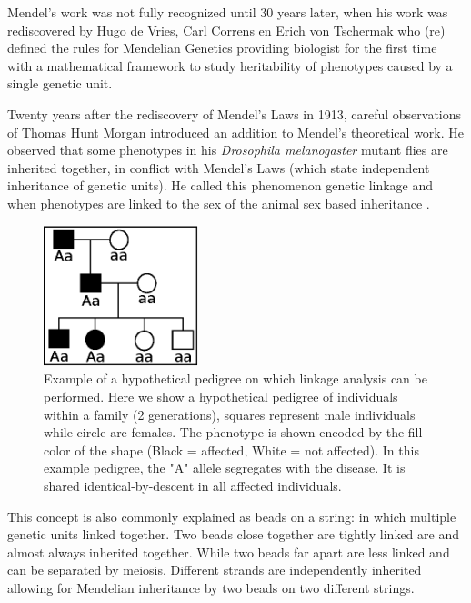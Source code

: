 Mendel's work was not fully recognized until 30 years later, when his work was 
rediscovered by Hugo de Vries, Carl Correns en Erich von Tschermak who (re) defined the 
rules for Mendelian Genetics \cite{deVries:1889} providing biologist for the first 
time with a mathematical framework to study heritability of phenotypes caused by a 
single genetic unit.

Twenty years after the rediscovery of Mendel's Laws in 1913, careful observations of 
Thomas Hunt Morgan introduced an addition to Mendel's theoretical work. He observed 
that some phenotypes in his \emph{Drosophila melanogaster} mutant flies are inherited 
together, in conflict with Mendel's Laws (which state independent inheritance of 
genetic units). He called this phenomenon genetic linkage and when phenotypes are 
linked to the sex of the animal sex based inheritance \cite{Morgan:1915, Morgan:1916}.

\begin{figure}
  \centering
  \includegraphics[width=0.4\textwidth]{eps/image_1_2.eps}
  \caption[Example of pedigree based linkage analysis.]
    {Example of a hypothetical pedigree on which linkage analysis can be performed. Here we show a 
    hypothetical pedigree of individuals within a family (2 generations), squares represent 
    male individuals while circle are females. The phenotype is shown encoded by the fill 
    color of the shape (Black = affected, White = not affected).  In this example pedigree, 
    the "A" allele segregates with the disease. It is shared identical-by-descent in all 
    affected individuals. }
    \label{fig:pedigree}
\end{figure}

This concept is also commonly explained as beads on a string: in which multiple genetic 
units linked together. Two beads close together are tightly linked are and almost always 
inherited together. While two beads far apart are less linked and can be separated by 
meiosis. Different strands are independently inherited allowing for Mendelian 
inheritance by two beads on two different strings.

